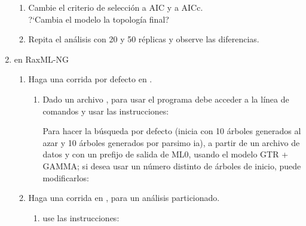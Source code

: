 \begin{enumerate}
\begin{enumerate}
		
		\item  Cambie el criterio de selecci\'on a AIC y a AICc.\\
		
		?`Cambia el modelo la topolog\'ia final?

		

		
		\item Repita el análisis con 20 y 50 r\'eplicas y observe las diferencias.

		
	\end{enumerate}


  \item{en RaxML-NG}

	\begin{enumerate}
		\item Haga una corrida por defecto en .
		\begin{enumerate}
			\item Dado un archivo , para usar el programa debe acceder a la l\'inea de comandos y usar las instrucciones:

			
			
			
			Para hacer la b\'usqueda por defecto (inicia con 10 
			\'arboles generados al azar y 10 \'arboles generados por 
			parsimo ia), a partir de un archivo de datos  
			 y con un prefijo de salida de ML0, usando 
			el modelo GTR + GAMMA; si desea usar un n\'umero distinto 
			de \'arboles de inicio, puede modificarlos:
			

		\end{enumerate}

		\item Haga una corrida en , para un an\'alisis particionado.




		    \begin{enumerate}
		    
		   		    
			  \item  use las instrucciones: 


\end{enumerate}
\end{enumerate}
\end{enumerate}
